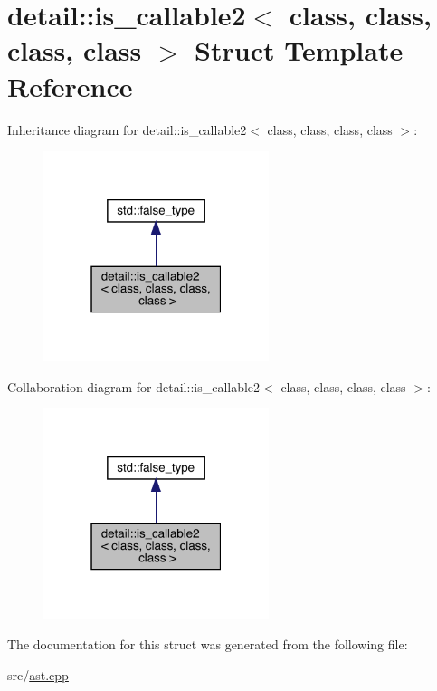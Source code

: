 \hypertarget{structdetail_1_1is__callable2}{}\section{detail\+:\+:is\+\_\+callable2$<$ class, class, class, class $>$ Struct Template Reference}
\label{structdetail_1_1is__callable2}


Inheritance diagram for detail\+:\+:is\+\_\+callable2$<$ class, class, class, class $>$\+:
\nopagebreak
\begin{figure}[H]
\begin{center}
\leavevmode
\includegraphics[width=187pt]{structdetail_1_1is__callable2__inherit__graph}
\end{center}
\end{figure}


Collaboration diagram for detail\+:\+:is\+\_\+callable2$<$ class, class, class, class $>$\+:
\nopagebreak
\begin{figure}[H]
\begin{center}
\leavevmode
\includegraphics[width=187pt]{structdetail_1_1is__callable2__coll__graph}
\end{center}
\end{figure}


The documentation for this struct was generated from the following file\+:\begin{DoxyCompactItemize}
\item 
src/\hyperlink{ast_8cpp}{ast.\+cpp}\end{DoxyCompactItemize}
